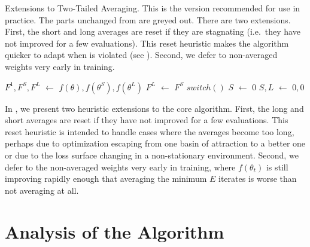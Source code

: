 \documentclass[twocolumn]{article}
\newcommand*\Let[2]{\State #1 $\gets$ #2}
\begin{document}
\begin{algorithm}[t]
  \caption[Extensions to Two-Tailed Averaging.]{\small Extensions to Two-Tailed Averaging.
This is the version recommended for use in practice.
The parts unchanged from  are greyed out.
There are two extensions.
First, the short and long averages are reset if they are stagnating (i.e.\  they have not improved for a few evaluations).
This reset heuristic makes the algorithm quicker to adapt when  is violated (see ).
Second, we defer to non-averaged weights very early in training.}
  \label{alg:two-tailed-averaging-with-extensions}
  \begin{algorithmic}[1]
    \color{gray!80}
      \Let{\textcolor{black}{$F^1,$}$F^S,F^L$}
          {\textcolor{black}{$f(\theta),$}$f(\theta^S),f(\theta^L)$}
        \Let{$F^L$}{$F^S$}
        \State $switch()$
      \color{black}
        \Let{$S$}{$0$}
      \EndIf
          \Let{$S,L$}{$0,0$}
        \EndIf
        \State {}
      \EndIf
      \color{gray!80}
      \State {}
    \EndFunction
  \end{algorithmic}
\end{algorithm}

In , we present two heuristic extensions to the core algorithm.
First, the long and short averages are reset if they have not improved for a few evaluations.
This reset heuristic is intended to handle cases where the averages become too long, perhaps due to optimization escaping from one basin of attraction to a better one or due to the loss surface changing in a non-stationary environment.
Second, we defer to the non-averaged weights very early in training, where $f(\theta_t)$ is still improving rapidly enough that averaging the minimum $E$ iterates is worse than not averaging at all.


\section{Analysis of the Algorithm}
\label{sec:tta-analysis}
\end{document}
